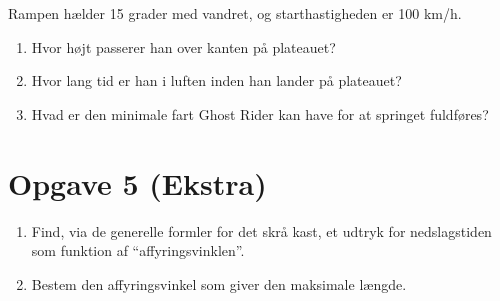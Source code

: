 \documentclass[a4paper, 12pt]{article}
\begin{document}
Rampen hælder 15 grader med vandret, og starthastigheden er 100 km/h.

\begin{enumerate}
\item Hvor højt passerer han over kanten på plateauet?
\item Hvor lang tid er han i luften inden han lander på plateauet?
\item Hvad er den minimale fart Ghost Rider kan have for at springet fuldføres?
\end{enumerate}

\section*{Opgave 5 (Ekstra)}
\label{sec:org44f8702}

\begin{enumerate}
\item Find, via de generelle formler for det skrå kast, et udtryk for nedslagstiden som funktion af “affyringsvinklen”.
\item Bestem den affyringsvinkel som giver den maksimale længde.
\end{enumerate}
\end{document}
